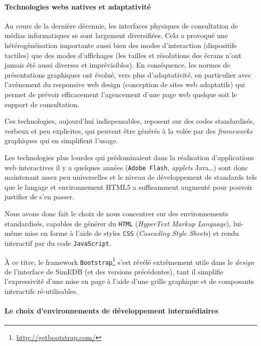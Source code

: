 	\paragraph*{Technologies webs \og natives\fg{}  et adaptativité}
	
	Au cours de la dernière décennie, les interfaces physiques de consultation de médias informatiques se sont largement diversifiées.
	Cela a provoqué une hétérogénéisation importante aussi bien des modes d'interaction (dispositifs \og tactiles\fg{}) que des modes d'affichages (les tailles et résolutions des écrans n'ont jamais été aussi diverses et imprévisibles).
	En conséquence, les normes de présentations graphiques ont évolué, vers plus d'\fg{}adaptativité\fg{}, en particulier avec l'avènement du \og responsive web design\fg{} (\og conception de sites web adaptatifs\fg{}) qui permet de prévoir efficacement l'agencement d'une page web quelque soit le support de consultation.
	
	Ces technologies, aujourd'hui indispensables, reposent sur des codes standardisés, verbeux et peu explicites, qui peuvent être générés à la volée par des \textit{frameworks} graphiques qui en simplifient l'usage.
	
	Les technologies plus lourdes qui prédominaient dans la réalisation d'applications web interactives il y a quelques années (\texttt{Adobe Flash}, \textit{applets} Java\ldots) sont donc maintenant assez peu universelles et le niveau de développement de standards tels que le langage et environnement HTML5 a suffisamment augmenté pour pouvoir justifier de s'en passer.
	
	Nous avons donc fait le choix de nous concentrer sur des environnements standardisés, capables de générer du \texttt{HTML} (\og \textit{HyperText Markup Language}\fg{}), lui-même mise en forme à l'aide de styles \texttt{CSS} (\og \textit{Cascading Style Sheets}\fg{}) et rendu interactif par du code \texttt{JavaScript}.
	
	À ce titre, le framework \texttt{Bootstrap}\footnote{\href{http://getbootstrap.com/}{http://getbootstrap.com/}} s'est révélé extrêmement utile dans le \textit{design} de l'interface de SimEDB (et des versions précédentes), tant il simplifie l'expressivité d'une mise en page à l'aide d'une grille graphique et de composants interactifs ré-utilisables.
	
	\paragraph*{Le choix d'environnements de développement intermédiaires}
	
